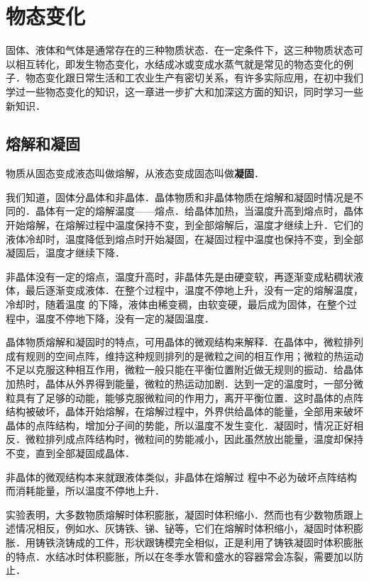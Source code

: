 

\chapter{物态变化}
固体、液体和气体是通常存在的三种物质状态．在一定条件下，这三种物质状态可以相互转化，即发生物态变化，水结成冰或变成水蒸气就是常见的物态变化的例子．物态变化跟日常生活和工农业生产有密切关系，有许多实际应用，在初中我们学过一些物态变化的知识，这一章进一步扩大和加深这方面的知识，同时学习一些新知识．

\section{熔解和凝固}
物质从固态变成液态叫做熔解，从液态变成固态叫做\textbf{凝固}．

我们知道，固体分晶体和非晶体．晶体物质和非晶体物质在熔解和凝固时情况是不同的．晶体有一定的熔解温度——熔点．给晶体加热，当温度升高到熔点时，晶体开始熔解，在熔解过程中温度保持不变，到全部熔解后，温度才继续上升．它们的液体冷却时，温度降低到熔点时开始凝固，在凝固过程中温度也保持不变，到全部凝固后，温度才继续下降．

非晶体没有一定的熔点，温度升高时，非晶体先是由硬变软，再逐渐变成粘稠状液体，最后逐渐变成液体．在整个过程中，温度不停地上升，没有一定的熔解温度，冷却时，随着温度
的下降，液体由稀变稠，由软变硬，最后成为固体，在整个过程中，温度不停地下降，没有一定的凝固温度．

晶体物质熔解和凝固时的特点，可用晶体的微观结构来解释．在晶体中，微粒排列成有规则的空间点阵，维持这种规则排列的是微粒之间的相互作用；微粒的热运动不足以克服这种相互作用，微粒一般只能在平衡位置附近做无规则的振动．给晶体加热时，晶体从外界得到能量，微粒的热运动加剧．达到一定的温度时，一部分微粒具有了足够的动能，能够克服微粒间的作用力，离开平衡位置．这时晶体的点阵结构被破坏，晶体开始熔解，在熔解过程中，外界供给晶体的能量，全部用来破坏晶体的点阵结构，增加分子间的势能，所以温度不发生变化．凝固时，情况正好相反．微粒排列成点阵结构时，微粒间的势能减小，因此虽然放出能量，温度却保持不变，直到全部凝固成晶体．

非晶体的微观结构本来就跟液体类似，非晶体在熔解过
程中不必为破坏点阵结构而消耗能量，所以温度不停地上升．

实验表明，大多数物质熔解时体积膨胀，凝固时体积缩小．然而也有少数物质跟上述情况相反，例如水、灰铸铁、锑、铋等，它们在熔解时体积缩小，凝固时体积膨胀．用铸铁浇铸成的工件，形状跟铸模完全相似，正是利用了铸铁凝固时体积膨胀的特点．水结冰时体积膨胀，所以在冬季水管和盛水的容器常会冻裂，需要加以防止．

